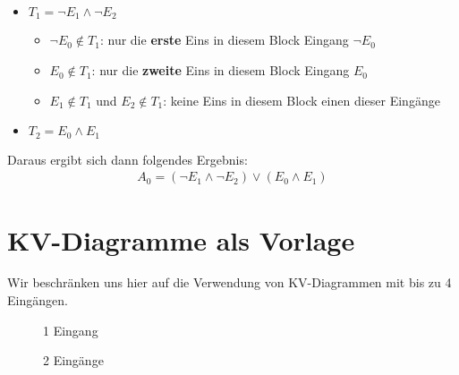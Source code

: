 \begin{example}
\begin{itemize}
\item $T_1 = \neg E_1 \wedge \neg E_2$
\begin{itemize}
\item $\neg E_0 \notin T_1$: nur die \textbf{erste} Eins in diesem Block  Eingang $\neg E_0$
\item $E_0 \notin T_1$: nur die \textbf{zweite} Eins in diesem Block  Eingang $E_0$
\item $E_1 \notin T_1$ und $E_2 \notin T_1$: keine Eins  in diesem Block einen dieser Eingänge
\end{itemize}
\item $T_2 = E_0 \wedge E_1$
\end{itemize}

Daraus ergibt sich dann folgendes Ergebnis:
\begin{align*}
A_0 = (\neg E_1 \wedge \neg E_2) \vee (E_0 \wedge E_1)
\end{align*}

\end{example}

\section{\acs{KV}-Diagramme als Vorlage}

Wir beschränken uns hier auf die Verwendung von \ac{KV}-Diagrammen mit bis zu \num{4} Eingängen.

\begin{figure}[htb]
\centering
\begin{minipage}{0.45\textwidth}
\centering
{}
\caption{\num{1} Eingang}
\label{figure-kv-diagramm-e-1}
\end{minipage}
\hfill
\begin{minipage}{0.45\textwidth}
\centering
{}
\caption{\num{2} Eingänge}
\label{figure-kv-diagramm-e-2}
\end{minipage}
\end{figure}

